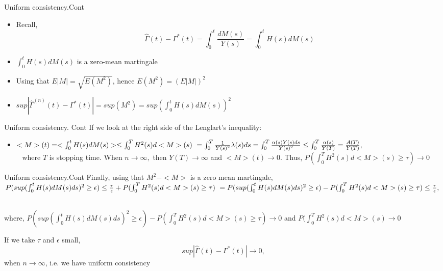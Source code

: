 \documentclass{beamer}
\begin{document}
\begin{frame}{Uniform consistency.Cont}
\begin{itemize}
\item Recall, $$\hat\Gamma(t) - \Gamma^*(t) = \int_0^t \frac{dM(s)}{Y(s)} = \int_0^t H(s) dM(s)$$
\item $\int_0^t H(s) dM(s)$ is a zero-mean martingale
\item Using that $E|M| =\sqrt{E(M^2)}$, hence $E(M^2) = (E|M|)^2$  
\item $sup|\hat\Gamma^{(n)}(t) - \Gamma^*(t)| = sup(M^2) = sup (\int_0^t H(s) dM(s))^2$
\end{itemize}
 \end{frame}


\begin{frame}{Uniform consistency. Cont}
If we look at the right side of the Lenglart's inequality: 
\begin{itemize}
  \item $<M>(t) = < \int_0^t H(s) dM(s) > \leq \int_0^T H^2(s) d<M>(s) \\\
= \int_0^T \frac{1}{Y(s)^2}\lambda(s)ds = \int_0^T \frac{\alpha(s) Y(s)ds}{Y(s)^2} \leq \int_0^T \frac{\alpha(s)}{Y(T)} = \frac{A(T)}{Y(T)},$ \\\
\newline
where $T$ is stopping time.
\newline
When $n \rightarrow \infty,$ then $Y(T) \rightarrow \infty$ and  $<M>(t) \rightarrow 0$.
\newline
\newline
Thus, $P(\int_0^T H^2(s)d<M>(s) \geq \tau) \rightarrow 0$


\end{itemize}
\end{frame}

\begin{frame}{Uniform consistency.Cont}
Finally, using that $M^2 - < M>$ is a zero mean martingale,
\newline
\newline
$P(sup(\int_0^t H(s)dM(s)ds)^2  \geq \epsilon) \leq \frac{\tau}{\epsilon} + P(\int_0^T H^2(s)d<M>(s) \geq \tau) \\\ 
= P(sup(\int_0^t H(s)dM(s)ds)^2  \geq \epsilon) - P(\int_0^T H^2(s)d<M>(s) \geq \tau) \leq \frac{\tau}{\epsilon},$ \\\

where,
\newline
$P(sup(\int_0^t H(s)dM(s)ds)^2  \geq \epsilon) - P(\int_0^T H^2(s)d<M>(s) \geq \tau) \rightarrow 0$ 
and 
\newline
$P(\int_0^T H^2(s)d<M>(s) \rightarrow 0 $ 

If we take $\tau$ and $\epsilon$ small,
$$sup|\hat\Gamma(t) - \Gamma^*(t)| \rightarrow 0,$$ when $n \rightarrow \infty$, i.e. we have uniform consistency  
\end{frame}
\end{document}

